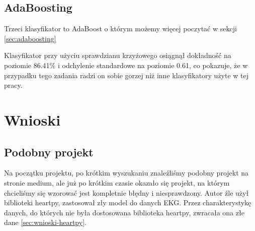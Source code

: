 \documentclass[12pt,a4paper]{article}
\begin{document}
\subsection{AdaBoosting}
Trzeci klasyfikator to AdaBoost o którym możemy więcej poczytać w sekcji \ref{sec:adaboosting}

Klasyfikator przy użyciu sprawdzianu krzyżowego osiągnął dokładność na poziomie 86.41\% i odchylenie standardowe na poziomie 0.61, co pokazuje, że w przypadku tego zadania radzi on sobie gorzej niż inne klasyfikatory użyte w tej pracy.

\section{Wnioski}







\subsection{Podobny projekt}
Na początku projektu, po krótkim wyszukaniu znaleźliśmy podobny projekt na stronie medium, ale już po krótkim czasie okazało się projekt, na którym chcieliśmy się wzorować jest kompletnie błędny i niesprawdzony. Autor źle użył biblioteki heartpy, zastosował zły model do danych EKG. Przez charakterystykę danych, do których nie była dostosowana biblioteka heartpy, zwracała ona złe dane \ref{sec:wnioski-heartpy}.
\end{document}
